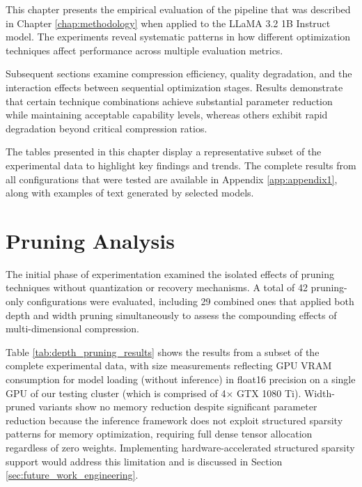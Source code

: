 
This chapter presents the empirical evaluation of the pipeline that was described in Chapter \ref{chap:methodology} when applied to the LLaMA 3.2 1B Instruct model. The experiments reveal systematic patterns in how different optimization techniques affect performance across multiple evaluation metrics.

Subsequent sections examine compression efficiency, quality degradation, and the interaction effects between sequential optimization stages. Results demonstrate that certain technique combinations achieve substantial parameter reduction while maintaining acceptable capability levels, whereas others exhibit rapid degradation beyond critical compression ratios.

The tables presented in this chapter display a representative subset of the experimental data to highlight key findings and trends. The complete results from all configurations that were tested are available in Appendix \ref{app:appendix1}, along with examples of text generated by selected models.

\section{Pruning Analysis} \label{sec:pruning_analysis}

The initial phase of experimentation examined the isolated effects of pruning techniques without quantization or recovery mechanisms. A total of 42 pruning-only configurations were evaluated, including 29 combined ones that applied both depth and width pruning simultaneously to assess the compounding effects of multi-dimensional compression.

Table \ref{tab:depth_pruning_results} shows the results from a subset of the complete experimental data, with size measurements reflecting GPU VRAM consumption for model loading (without inference) in float16 precision on a single GPU of our testing cluster (which is comprised of 4$\times$ GTX 1080 Ti). Width-pruned variants show no memory reduction despite significant parameter reduction because the inference framework does not exploit structured sparsity patterns for memory optimization, requiring full dense tensor allocation regardless of zero weights. Implementing hardware-accelerated structured sparsity support would address this limitation and is discussed in Section \ref{sec:future_work_engineering}.

